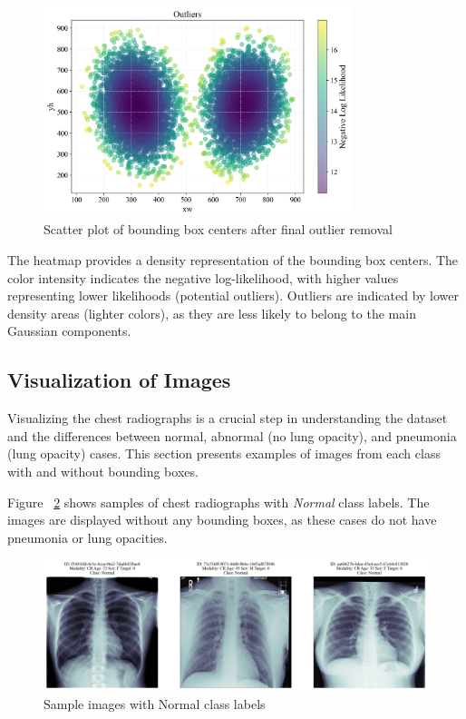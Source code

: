 \begin{figure}[H]
    \begin{center}
        \includegraphics[width = 0.8\textwidth]{figures/Figure22.png}
        \caption{Scatter plot of bounding box centers after final outlier removal}
        \label{fig:cha-2 figure19}
    \end{center}
\end{figure}

The heatmap provides a density representation of the bounding box centers. The color intensity indicates the negative log-likelihood, with higher values representing lower likelihoods (potential outliers). Outliers are indicated by lower density areas (lighter colors), as they are less likely to belong to the main Gaussian components.

\subsection{Visualization of Images}
\label{subsec:chap2 section 1.6}

Visualizing the chest radiographs is a crucial step in understanding the dataset and the differences between normal, abnormal (no lung opacity), and pneumonia (lung opacity) cases. This section presents examples of images from each class with and without bounding boxes.

Figure ~\ref{fig:cha-2 figure20} shows samples of chest radiographs with \emph{Normal} class labels. The images are displayed without any bounding boxes, as these cases do not have pneumonia or lung opacities.

\begin{figure}[H]
    \begin{center}
        \includegraphics[width = \textwidth]{figures/Figure24.png}
        \caption{Sample images with Normal class labels}
        \label{fig:cha-2 figure20}
    \end{center}
\end{figure}

